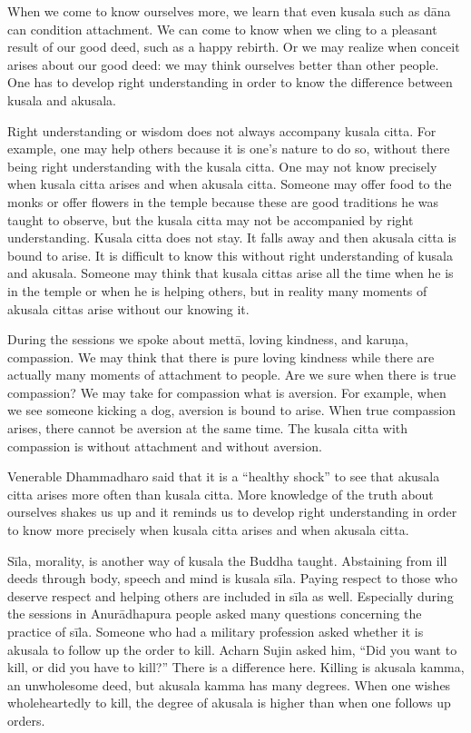 When we come to know ourselves more, we learn that even kusala such as
dāna can condition attachment. We can come to know when we cling to a
pleasant result of our good deed, such as a happy rebirth. Or we may
realize when conceit arises about our good deed: we may think ourselves
better than other people. One has to develop right understanding in
order to know the difference between kusala and akusala.

Right understanding or wisdom does not always accompany kusala citta.
For example, one may help others because it is one's nature to do so,
without there being right understanding with the kusala citta. One may
not know precisely when kusala citta arises and when akusala citta.
Someone may offer food to the monks or offer flowers in the temple
because these are good traditions he was taught to observe, but the
kusala citta may not be accompanied by right understanding. Kusala citta
does not stay. It falls away and then akusala citta is bound to arise.
It is difficult to know this without right understanding of kusala and
akusala. Someone may think that kusala cittas arise all the time when he
is in the temple or when he is helping others, but in reality many
moments of akusala cittas arise without our knowing it.

During the sessions we spoke about mettā, loving kindness, and karuṇa,
compassion. We may think that there is pure loving kindness while there
are actually many moments of attachment to people. Are we sure when
there is true compassion? We may take for compassion what is aversion.
For example, when we see someone kicking a dog, aversion is bound to
arise. When true compassion arises, there cannot be aversion at the same
time. The kusala citta with compassion is without attachment and without
aversion.

Venerable Dhammadharo said that it is a ``healthy shock'' to see that
akusala citta arises more often than kusala citta. More knowledge of the
truth about ourselves shakes us up and it reminds us to develop right
understanding in order to know more precisely when kusala citta arises
and when akusala citta.

Sīla, morality, is another way of kusala the Buddha taught. Abstaining
from ill deeds through body, speech and mind is kusala sīla. Paying
respect to those who deserve respect and helping others are included in
sīla as well. Especially during the sessions in Anurādhapura people
asked many questions concerning the practice of sīla. Someone who had a
military profession asked whether it is akusala to follow up the order
to kill. Acharn Sujin asked him, ``Did you want to kill, or did you have
to kill?'' There is a difference here. Killing is akusala kamma, an
unwholesome deed, but akusala kamma has many degrees. When one wishes
wholeheartedly to kill, the degree of akusala is higher than when one
follows up orders.

